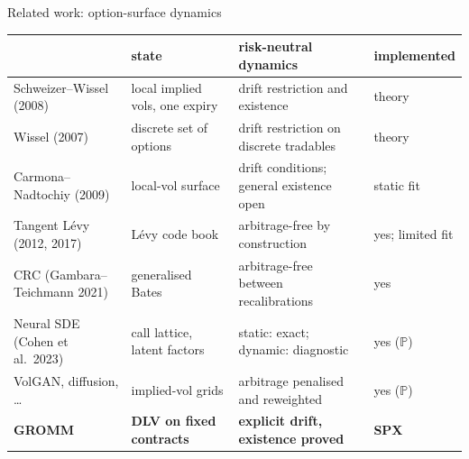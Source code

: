 \documentclass[aspectratio=169,11pt,handout]{beamer}
\newcommand{\PP}{\mathbb P}
\begin{document}
\begin{frame}{Related work: option-surface dynamics}
\vspace{-0.4em}\scriptsize
\renewcommand{\arraystretch}{1.3}
\begin{tabular}{@{}>{\raggedright\arraybackslash}p{3.5cm}>{\raggedright\arraybackslash}p{2.9cm}>{\raggedright\arraybackslash}p{3.8cm}>{\raggedright\arraybackslash}p{1.7cm}@{}}
\toprule
 & \textbf{state} & \textbf{risk-neutral dynamics} & \textbf{implemented} \\
\midrule
Schweizer--Wissel (2008) & local implied vols, one expiry & drift restriction and existence & theory \\
Wissel (2007) & discrete set of options & drift restriction on discrete tradables & theory \\
Carmona--Nadtochiy (2009) & local-vol surface & drift conditions; general existence open & static fit \\
Tangent L\'evy (2012, 2017) & L\'evy code book & arbitrage-free by construction & yes; limited fit \\
CRC (Gambara--Teichmann 2021) & generalised Bates & arbitrage-free between recalibrations & yes \\
Neural SDE (Cohen et al.\ 2023) & call lattice, latent factors & static: exact; dynamic: diagnostic & yes ($\PP$) \\
VolGAN, diffusion, \dots & implied-vol grids & arbitrage penalised and reweighted & yes ($\PP$) \\
\midrule
\textbf{GROMM} & \textbf{DLV on fixed contracts} & \textbf{explicit drift, existence proved} & \textbf{SPX} \\
\bottomrule
\end{tabular}
\end{frame}
\end{document}
